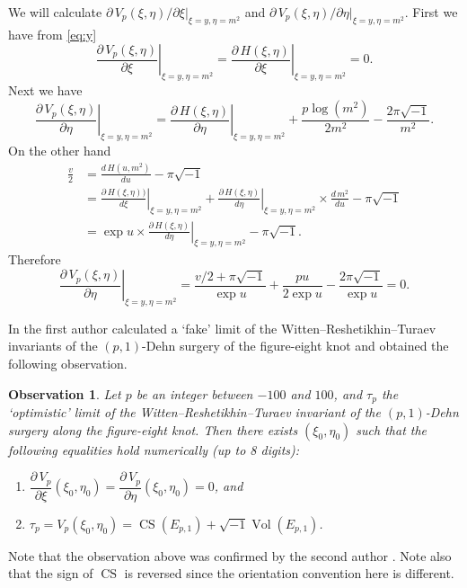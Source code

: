 \documentclass[a4paper]{amsart}
\theoremstyle{plain}
\newtheorem*{obs*}{Observation}
\theoremstyle{definition}
\theoremstyle{remark}
\newcommand{\Vol}{\operatorname{Vol}}
\newcommand{\CS}{\operatorname{CS}}
\numberwithin{equation}{section}
\begin{document}
We will calculate
$\partial\,V_p(\xi,\eta)/\partial{\xi}\bigr|_{\xi=y,\eta=m^2}$ and
$\partial\,V_p(\xi,\eta)/\partial{\eta}\bigr|_{\xi=y,\eta=m^2}$.
First we have from \eqref{eq:y}
\begin{equation*}
  \left.
    \frac{\partial\,V_p(\xi,\eta)}{\partial{\xi}}
  \right|_{\xi=y,\eta=m^2}
  =
  \left.
    \frac{\partial\,H(\xi,\eta)}{\partial{\xi}}
  \right|_{\xi=y,\eta=m^2}
  =
  0.
\end{equation*}
Next we have
\begin{equation*}
  \left.
    \frac{\partial\,V_p(\xi,\eta)}{\partial\eta}
  \right|_{\xi=y,\eta=m^2}
  =
  \left.
    \frac{\partial\,H(\xi,\eta)}{\partial\eta}
  \right|_{\xi=y,\eta=m^2}
  +
  \frac{p\log\left(m^2\right)}{2m^2}
  -\frac{2\pi\sqrt{-1}}{m^2}.
\end{equation*}
On the other hand
\begin{equation*}
\begin{split}
  \frac{v}{2}
  &=
  \frac{d\,H(u,m^2)}{du}
  -\pi\sqrt{-1}
  \\
  &=
  \left.
    \frac{\partial\,H(\xi,\eta))}{d\xi}
  \right|_{\xi=y,\eta=m^2}
  +
  \left.
    \frac{\partial\,H(\xi,\eta)}{d\eta}
  \right|_{\xi=y,\eta=m^2}
  \times
  \frac{d\,m^2}{du}
  -
  \pi\sqrt{-1}
  \\
  &=
  \exp{u}\times
  \left.
    \frac{\partial\,H(\xi,\eta)}{d\eta}
  \right|_{\xi=y,\eta=m^2}
  -
  \pi\sqrt{-1}.
\end{split}
\end{equation*}
Therefore
\begin{equation*}
  \left.
    \frac{\partial\,V_p(\xi,\eta)}{\partial\eta}
  \right|_{\xi=y,\eta=m^2}
  =
  \frac{v/2+\pi\sqrt{-1}}{\exp{u}}
  +\frac{pu}{2\exp{u}}
  -\frac{2\pi\sqrt{-1}}{\exp{u}}
  =0.
\end{equation*}
\par
In \cite{Murakami:SURIK00} the first author calculated a `fake' limit of the
Witten--Reshetikhin--Turaev invariants of the $(p,1)$-Dehn surgery of the
figure-eight knot and obtained the following observation.
\begin{obs*}
Let $p$ be an integer between $-100$ and $100$, and
$\tau_p$ the `optimistic' limit of the Witten--Reshetikhin--Turaev
invariant of the $(p,1)$-Dehn surgery along the figure-eight knot.
Then there exists $(\xi_0,\eta_0)$ such that the following equalities hold
numerically (up to 8 digits):
\begin{enumerate}
  \item
  $\dfrac{\partial\,V_p}{\partial\xi}(\xi_0,\eta_0)
  =\dfrac{\partial\,V_p}{\partial\eta}(\xi_0,\eta_0)=0$, and
  \item
  $\tau_p=V_p(\xi_0,\eta_0)=\CS(E_{p,1})+\sqrt{-1}\Vol(E_{p,1})$.
\end{enumerate}
\end{obs*}
\par
Note that the observation above was confirmed by the second author
\cite{Yokota:GTM02}.
Note also that the sign of $\CS$ is reversed since the orientation convention here is different.


\end{document}
